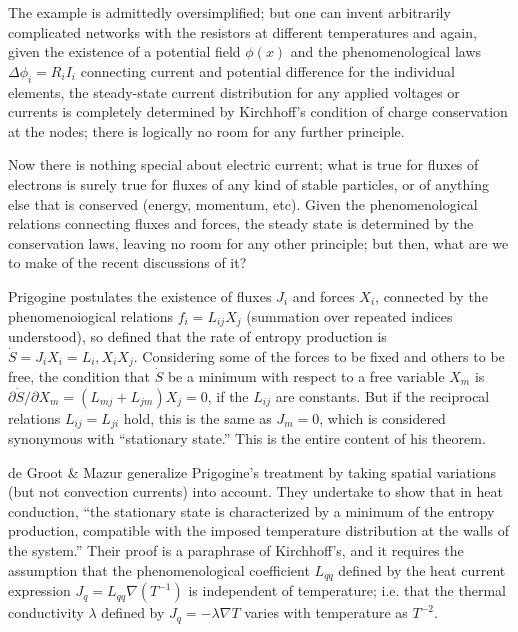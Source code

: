 \documentclass{article}
\begin{document}
The example is admittedly oversimplified; but one can invent arbitrarily complicated networks with the resistors at different temperatures and again, given the existence of a potential field $\phi(x)$ and the phenomenological laws $\Delta \phi_i=R_i I_i$ connecting current and potential difference for the individual elements, the steady-state current distribution for any applied voltages or currents is completely determined by Kirchhoff's condition of charge conservation at the nodes; there is logically no room for any further principle.

Now there is nothing special about electric current; what is true for fluxes of electrons is surely true for fluxes of any kind of stable particles, or of anything else that is conserved (energy, momentum, etc). Given the phenomenological relations connecting fluxes and forces, the steady state is determined by the conservation laws, leaving no room for any other principle; but then, what are we to make of the recent discussions of it?

Prigogine \cite{prigogine1961} postulates the existence of fluxes $J_i$ and forces $X_i$, connected by the phenomenoiogical relations $f_i=L_{i j} X_j$ (summation over repeated indices understood), so defined that the rate of entropy production is $\dot{S}=J_i X_i=L_i, X_i X_j$. Considering some of the forces to be fixed and others to be free, the condition that $\dot{S}$ be a minimum with respect to a free variable $X_m$ is $\partial \dot{S} / \partial X_m=\left(L_{m j}+L_{j m}\right) X_j=0$, if the $L_{i j}$ are constants. But if the reciprocal relations $L_{i j}=L_{j i}$ hold, this is the same as $J_m=0$, which is considered synonymous with ``stationary state.'' This is the entire content of his theorem.

de Groot \& Mazur \cite{degroot1962} generalize Prigogine's treatment by taking spatial variations (but not convection currents) into account. They undertake to show that in heat conduction, ``the stationary state is characterized by a minimum of the entropy production, compatible with the imposed temperature distribution at the walls of the system.'' Their proof is a paraphrase of Kirchhoff's, and it requires the assumption that the phenomenological coefficient $L_{q q}$ defined by the heat current expression $J_q=L_{q q} \nabla\left(T^{-1}\right)$ is independent of temperature; i.e. that the thermal conductivity $\lambda$ defined by $J_q=-\lambda \nabla T$ varies with temperature as $T^{-2}$.
\end{document}
